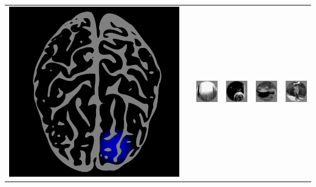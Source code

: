 \documentclass{beamer}
\begin{document}
\begin{frame}
\begin{center}
\begin{tabular}{c|c|cccc}
\includegraphics[scale = 0.035]{brain7.png} & \hspace{0.5in} 
& \includegraphics[scale = .26]{img5.png}
& \includegraphics[scale = .26]{img6.png}
& \includegraphics[scale = .26]{img7.png}
& \includegraphics[scale = .26]{img8.png}\\

\end{tabular}
\end{center}
\end{frame}
\end{document}
